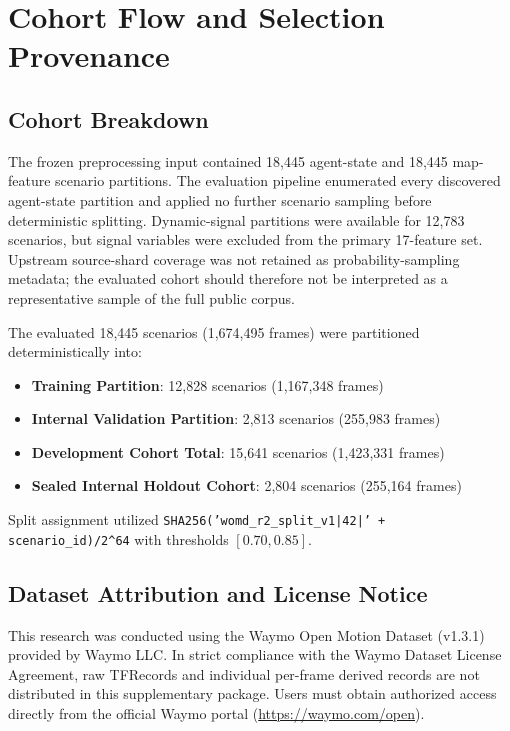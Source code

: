 \section{Cohort Flow and Selection Provenance}
\label{sec:supp_flow}

\subsection{Cohort Breakdown}
The frozen preprocessing input contained 18,445 agent-state and 18,445 map-feature scenario partitions. The evaluation pipeline enumerated every discovered agent-state partition and applied no further scenario sampling before deterministic splitting. Dynamic-signal partitions were available for 12,783 scenarios, but signal variables were excluded from the primary 17-feature set. Upstream source-shard coverage was not retained as probability-sampling metadata; the evaluated cohort should therefore not be interpreted as a representative sample of the full public corpus.

The evaluated 18,445 scenarios (1,674,495 frames) were partitioned deterministically into:
\begin{itemize}\setlength{\itemsep}{0pt}\setlength{\parskip}{0pt}\setlength{\parsep}{0pt}
    \item \textbf{Training Partition}: 12,828 scenarios (1,167,348 frames)
    \item \textbf{Internal Validation Partition}: 2,813 scenarios (255,983 frames)
    \item \textbf{Development Cohort Total}: 15,641 scenarios (1,423,331 frames)
    \item \textbf{Sealed Internal Holdout Cohort}: 2,804 scenarios (255,164 frames)
\end{itemize}
Split assignment utilized \texttt{SHA256('womd\_r2\_split\_v1|42|' + scenario\_id)/2\^{}64} with thresholds $[0.70, 0.85]$.

\subsection{Dataset Attribution and License Notice}
This research was conducted using the Waymo Open Motion Dataset (v1.3.1) provided by Waymo LLC. In strict compliance with the Waymo Dataset License Agreement, raw TFRecords and individual per-frame derived records are not distributed in this supplementary package. Users must obtain authorized access directly from the official Waymo portal (\url{https://waymo.com/open}).

